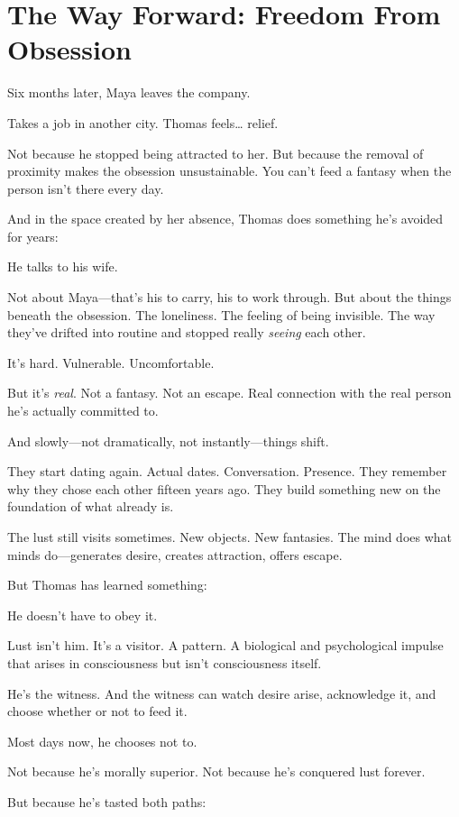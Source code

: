 \documentclass[11pt,twoside]{book}
\begin{document}
\section*{The Way Forward: Freedom From Obsession}

Six months later, Maya leaves the company.

Takes a job in another city. Thomas feels\ldots{} relief.

Not because he stopped being attracted to her. But because the removal of proximity makes the obsession unsustainable. You can't feed a fantasy when the person isn't there every day.

And in the space created by her absence, Thomas does something he's avoided for years:

He talks to his wife.

Not about Maya—that's his to carry, his to work through. But about the things beneath the obsession. The loneliness. The feeling of being invisible. The way they've drifted into routine and stopped really \emph{seeing} each other.

It's hard. Vulnerable. Uncomfortable.

But it's \emph{real}. Not a fantasy. Not an escape. Real connection with the real person he's actually committed to.

And slowly—not dramatically, not instantly—things shift.

They start dating again. Actual dates. Conversation. Presence. They remember why they chose each other fifteen years ago. They build something new on the foundation of what already is.

The lust still visits sometimes. New objects. New fantasies. The mind does what minds do—generates desire, creates attraction, offers escape.

But Thomas has learned something:

He doesn't have to obey it.

Lust isn't him. It's a visitor. A pattern. A biological and psychological impulse that arises in consciousness but isn't consciousness itself.

He's the witness. And the witness can watch desire arise, acknowledge it, and choose whether or not to feed it.

Most days now, he chooses not to.

Not because he's morally superior. Not because he's conquered lust forever.

But because he's tasted both paths:
\end{document}
